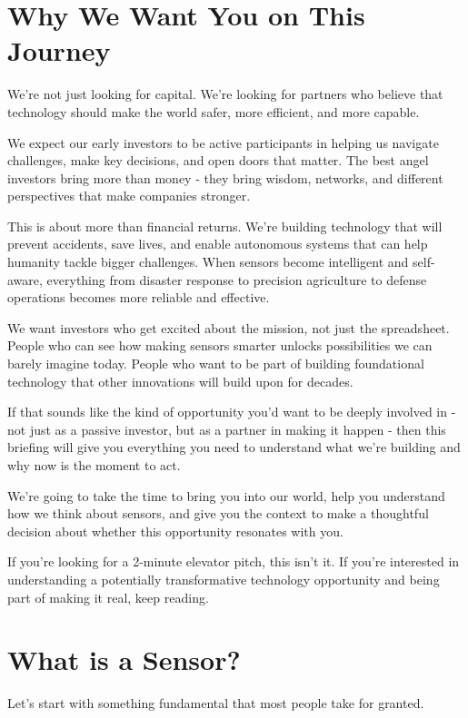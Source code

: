 \documentclass[11pt,letterpaper]{article}
\begin{document}
\section*{Why We Want You on This Journey}

We're not just looking for capital. We're looking for partners who believe that technology should make the world safer, more efficient, and more capable.

We expect our early investors to be active participants in helping us navigate challenges, make key decisions, and open doors that matter. The best angel investors bring more than money - they bring wisdom, networks, and different perspectives that make companies stronger.

This is about more than financial returns. We're building technology that will prevent accidents, save lives, and enable autonomous systems that can help humanity tackle bigger challenges. When sensors become intelligent and self-aware, everything from disaster response to precision agriculture to defense operations becomes more reliable and effective.

We want investors who get excited about the mission, not just the spreadsheet. People who can see how making sensors smarter unlocks possibilities we can barely imagine today. People who want to be part of building foundational technology that other innovations will build upon for decades.

If that sounds like the kind of opportunity you'd want to be deeply involved in - not just as a passive investor, but as a partner in making it happen - then this briefing will give you everything you need to understand what we're building and why now is the moment to act.

We're going to take the time to bring you into our world, help you understand how we think about sensors, and give you the context to make a thoughtful decision about whether this opportunity resonates with you.

If you're looking for a 2-minute elevator pitch, this isn't it. If you're interested in understanding a potentially transformative technology opportunity and being part of making it real, keep reading.

\section*{What is a Sensor?}

Let's start with something fundamental that most people take for granted.
\end{document}

